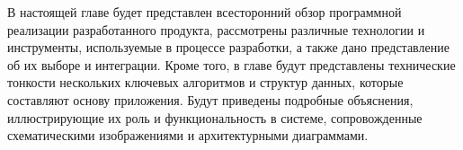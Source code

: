 В настоящей главе будет представлен всесторонний обзор программной реализации разработанного продукта, рассмотрены различные технологии и инструменты, используемые в процессе разработки, а также дано представление об их выборе и интеграции. Кроме того, в главе будут представлены технические тонкости нескольких ключевых алгоритмов и структур данных, которые составляют основу приложения. Будут приведены подробные объяснения, иллюстрирующие их роль и функциональность в системе, сопровожденные схематическими изображениями и архитектурными диаграммами.
